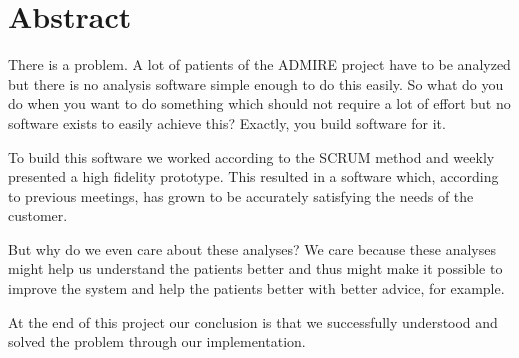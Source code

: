 \chapter*{Abstract}

There is a problem. A lot of patients of the ADMIRE project have to be analyzed but there is no analysis software simple enough to do this easily. So what do you do when you want to do something which should not require a lot of effort but no software exists to easily achieve this? Exactly, you build software for it.

To build this software we worked according to the SCRUM method and weekly presented a high fidelity prototype. This resulted in a software which, according to previous meetings, has grown to be accurately satisfying the needs of the customer. %

But why do we even care about these analyses? We care because these analyses might help us understand the patients better and thus might make it possible to improve the system and help the patients better with better advice, for example.

At the end of this project our conclusion is that we successfully understood and solved the problem through our implementation.

